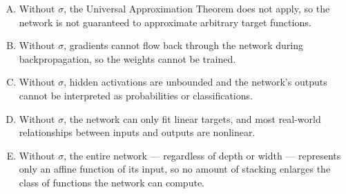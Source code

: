\documentclass[12pt]{amsart}
\begin{document}
\begin{enumerate}[(A)]
\item Without $\sigma$, the Universal Approximation Theorem does not apply, so the network is not guaranteed to approximate arbitrary target functions.
\item Without $\sigma$, gradients cannot flow back through the network during backpropagation, so the weights cannot be trained.
\item Without $\sigma$, hidden activations are unbounded and the network's outputs cannot be interpreted as probabilities or classifications.
\item Without $\sigma$, the network can only fit linear targets, and most real-world relationships between inputs and outputs are nonlinear.
\item Without $\sigma$, the entire network --- regardless of depth or width --- represents only an affine function of its input, so no amount of stacking enlarges the class of functions the network can compute.
\end{enumerate}
\end{document}
